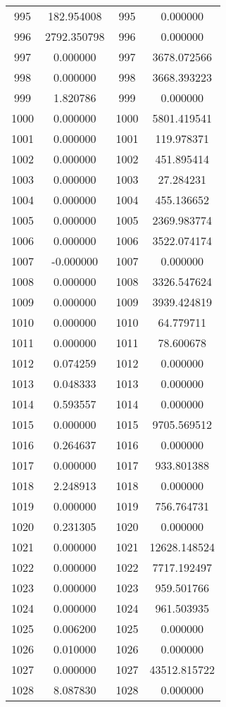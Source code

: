 \documentclass[12pt]{article}
\begin{document}
\begin{longtable}{@{}cccc@{}}
995 & 182.954008 & 995 & 0.000000 \\
996 & 2792.350798 & 996 & 0.000000 \\
997 & 0.000000 & 997 & 3678.072566 \\
998 & 0.000000 & 998 & 3668.393223 \\
999 & 1.820786 & 999 & 0.000000 \\
1000 & 0.000000 & 1000 & 5801.419541 \\
1001 & 0.000000 & 1001 & 119.978371 \\
1002 & 0.000000 & 1002 & 451.895414 \\
1003 & 0.000000 & 1003 & 27.284231 \\
1004 & 0.000000 & 1004 & 455.136652 \\
1005 & 0.000000 & 1005 & 2369.983774 \\
1006 & 0.000000 & 1006 & 3522.074174 \\
1007 & -0.000000 & 1007 & 0.000000 \\
1008 & 0.000000 & 1008 & 3326.547624 \\
1009 & 0.000000 & 1009 & 3939.424819 \\
1010 & 0.000000 & 1010 & 64.779711 \\
1011 & 0.000000 & 1011 & 78.600678 \\
1012 & 0.074259 & 1012 & 0.000000 \\
1013 & 0.048333 & 1013 & 0.000000 \\
1014 & 0.593557 & 1014 & 0.000000 \\
1015 & 0.000000 & 1015 & 9705.569512 \\
1016 & 0.264637 & 1016 & 0.000000 \\
1017 & 0.000000 & 1017 & 933.801388 \\
1018 & 2.248913 & 1018 & 0.000000 \\
1019 & 0.000000 & 1019 & 756.764731 \\
1020 & 0.231305 & 1020 & 0.000000 \\
1021 & 0.000000 & 1021 & 12628.148524 \\
1022 & 0.000000 & 1022 & 7717.192497 \\
1023 & 0.000000 & 1023 & 959.501766 \\
1024 & 0.000000 & 1024 & 961.503935 \\
1025 & 0.006200 & 1025 & 0.000000 \\
1026 & 0.010000 & 1026 & 0.000000 \\
1027 & 0.000000 & 1027 & 43512.815722 \\
1028 & 8.087830 & 1028 & 0.000000 \\

\end{longtable}
\end{document}
